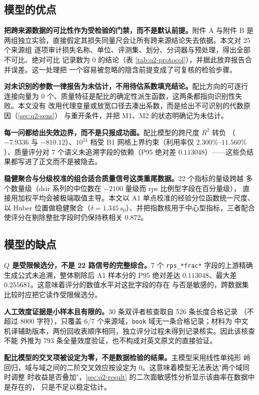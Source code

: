 \documentclass[bwprint]{gmcmthesis}
\numberwithin{equation}{section}
\numberwithin{figure}{section}
\numberwithin{table}{section}
\begin{document}
\subsection{模型的优点}

\textbf{把跨来源数据的可比性作为受检验的门禁，而不是默认前提。}附件 A 与附件 B 是
两组独立实验，直接假定其损失同量尺会让所有跨来源结论失去依据。本文对 25 个来源组
逐项审计损失名称、单位、评测集、划分、分词器与预处理，得出全部不可比、绝对可比
记录数为 0 的结论（表 \ref{tab:q2-protocol}），并据此放弃报告合并误差。这一处理把
一个容易被忽略的隐含前提变成了可复核的检验步骤。

\textbf{对未识别的参数一律报告为未估计，不用待估系数填充结论。}配比方向的可逐行
连接向量为 0 个、质量特征是配比的确定性派生函数，这两条都指向识别性失败。本文没有
改用代理变量或放宽口径去凑出系数，而是给出不可识别的代数原因（\ref{sec:q2-sens}）
与重开条件，并把 M1、M2 的状态明确记为未估计。

\textbf{每一问都给出失效边界，而不是只报成功面。}配比模型的跨尺度 $R^2$ 转负
（$-7.9336$ 与 $-810.12$）、$10^{24}$ 档受 B1 网格上界约束（利用率仅
$2.300\%$--$11.560\%$）、质量评分对 7 个语义未追溯字段的依赖（P95 绝对差
$0.113048$）——这些负结果都写进了正文而不是被隐去。

\textbf{稳健聚合与分级校准的组合适合质量信号这类重尾数据。}22 个指标的量级跨越
多个数量级（dsir 系列的中位数在 $-2100$ 量级而 rps 比例型字段在百分量级），
直接用加权平均会被极端取值主导。本文以 A1 单点校准的经验分位函数统一尺度、以
Huber 位置做稳健聚合（$\delta=1.345\,s_0$）、并把指数核用于中心型指标，三者配合
使评分在剔除整批字段时仍保持秩相关 $0.872$。

\subsection{模型的缺点}

\textbf{$Q$ 是受限候选分，不是 22 路信号的完整综合。}7 个
\texttt{rps\_*frac*} 字段的上游精确生成公式未追溯，整体剔除后 A1 样本分的 P95
绝对差达 $0.113048$、最大差 $0.255681$。这意味着评分的数值水平对这批字段的存在
与否是敏感的，跨数据集比较时应把它读作受限候选分。

\textbf{人工效度证据是小样本且有限的。}30 条双评者核查取自 526 条长度合格记录
（不超过 8000 字符），只覆盖 6/7 个来源域，\texttt{book} 域无一条合格记录；材料为
中文机译辅助版本，两份回收表顺序相同，独立评分过程未得到记录核实。因此该核查不能
外推为 793 条全量效度验证，也不构成对英文原文的直接验证。

\textbf{配比模型的交叉项被设定为零，不是数据检验的结果。}主模型采用线性单纯形
岭回归，域与域之间的二阶交叉效应按设定为 0。这意味着模型无法表达"两个域同时调整
时收益是否叠加"，\ref{sec:q2-result} 的二次面敏感性分析显示该曲率在数据中是存在的，
只是不足以稳定估计。
\end{document}
